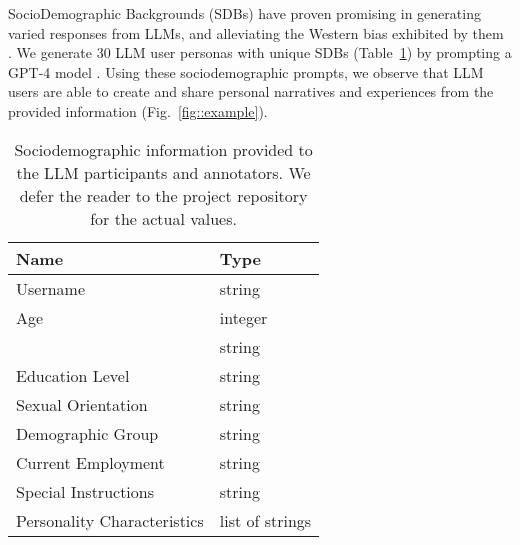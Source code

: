 SocioDemographic Backgrounds (SDBs) have proven promising in generating varied responses from LLMs, and alleviating the Western bias exhibited by them \cite{burton2024large}. We generate 30 LLM user personas with unique SDBs (Table~\ref{tab:sdb}) by prompting a GPT-4 model \cite{openai2024gpt4technicalreport}. Using these sociodemographic prompts, we observe that LLM users are able to create and share personal narratives and experiences from the provided information (Fig.~\ref{fig::example}). 

\begin{table}[t]
	\centering
	\begin{tabular}{ll}
		\toprule
		\textbf{Name} & \textbf{Type} \\
		\midrule
		Username & string \\
		Age & integer \\
		 & string \\
		Education Level & string \\
		Sexual Orientation & string \\
		Demographic Group & string \\
		Current Employment & string \\
		Special Instructions & string \\
		Personality Characteristics & list of strings \\
		\bottomrule
	\end{tabular}
	\caption{Sociodemographic information provided to the LLM participants and annotators. We defer the reader to the project repository for the actual values.\analysislink}
	\label{tab:sdb}
\end{table}
